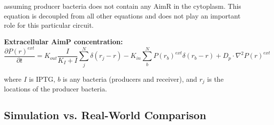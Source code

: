 \documentclass[11pt,a4paper]{article}
\begin{document}
assuming producer bacteria does not contain any AimR in the cytoplasm. This equation is decoupled from all other equations and does not play an important role for this particular circuit.

\textbf{Extracellular AimP concentration:}
\begin{equation}
    \frac{\partial P(r)^{ext}}{\partial t} = K_{out} \frac{I}{K_{I} + I} \sum_{j}^{N} \delta(r_j - r)  - K_{in} \sum_{b}^{N} P(r_b)^{ext}\delta(r_b - r)+ D_p \cdot \nabla^2 P(r)^{ext}
\end{equation}

where $I$ is IPTG, $b$ is any bacteria (producers and receiver), and $r_j$ is the locations of the producer bacteria.

\subsection{Simulation vs. Real-World Comparison}
\end{document}
